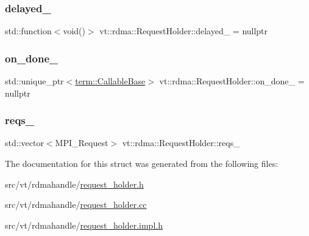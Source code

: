 \subsubsection{\texorpdfstring{delayed\+\_\+}{delayed\_}}
{\footnotesize\ttfamily std\+::function$<$void()$>$ vt\+::rdma\+::\+Request\+Holder\+::delayed\+\_\+ = nullptr\hspace{0.3cm}{\ttfamily [private]}}

\mbox{\label{structvt_1_1rdma_1_1_request_holder_ac10cdebd8a619357fe95b1abaea3bc6d}} 
\subsubsection{\texorpdfstring{on\+\_\+done\+\_\+}{on\_done\_}}
{\footnotesize\ttfamily std\+::unique\+\_\+ptr$<$\hyperlink{structvt_1_1term_1_1_callable_base}{term\+::\+Callable\+Base}$>$ vt\+::rdma\+::\+Request\+Holder\+::on\+\_\+done\+\_\+ = nullptr\hspace{0.3cm}{\ttfamily [private]}}

\mbox{\label{structvt_1_1rdma_1_1_request_holder_ab2c38a29749f7704a49786851d947571}} 
\subsubsection{\texorpdfstring{reqs\+\_\+}{reqs\_}}
{\footnotesize\ttfamily std\+::vector$<$M\+P\+I\+\_\+\+Request$>$ vt\+::rdma\+::\+Request\+Holder\+::reqs\+\_\+\hspace{0.3cm}{\ttfamily [private]}}



The documentation for this struct was generated from the following files\+:\begin{DoxyCompactItemize}
\item 
src/vt/rdmahandle/\hyperlink{request__holder_8h}{request\+\_\+holder.\+h}\item 
src/vt/rdmahandle/\hyperlink{request__holder_8cc}{request\+\_\+holder.\+cc}\item 
src/vt/rdmahandle/\hyperlink{request__holder_8impl_8h}{request\+\_\+holder.\+impl.\+h}\end{DoxyCompactItemize}
